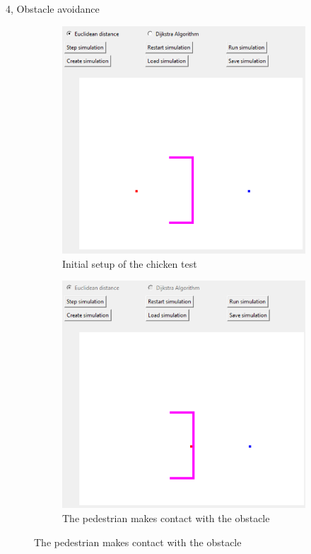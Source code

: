 \documentclass[10pt,a4paper]{article}
\begin{document}
\begin{task}{4, Obstacle avoidance}
\begin{figure}[H]
\begin{subfigure}{0.5\textwidth}
 \centering
 \includegraphics[width=1\textwidth]{images/task4_chicken_start.png}
 \caption{Initial setup of the chicken test}
 
 \end{subfigure}
 \hspace{1em}
\begin{subfigure}{0.5\textwidth}
 \centering
 \includegraphics[width=1\textwidth]{images/task4_chicken_first_contact.png}
 \caption{The pedestrian makes contact with the obstacle} 
 \end{subfigure}
 

\end{figure}
\end{task}
\end{document}
